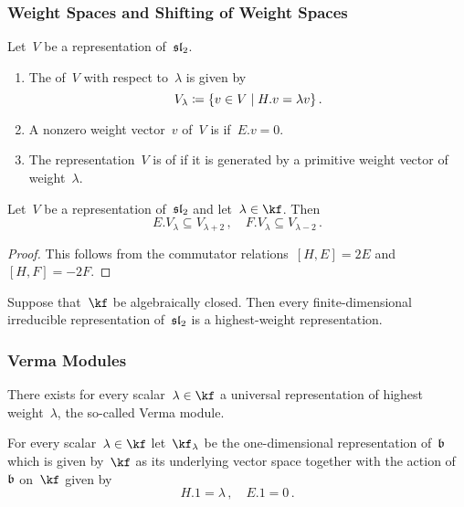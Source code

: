 \documentclass[a4paper, 11pt, oneside]{scrartcl}
\begin{document}
\subsubsection{Weight Spaces and Shifting of Weight Spaces}

\begin{definition}
  Let~$V$ be a representation of~$\mathfrak{sl}_2$.
  \begin{enumerate}
    \item
      The  of~$V$ with respect to~$\lambda$ is given by
      \[
        V_\lambda
        \defined
        \{ v \in V \suchthat H.v = \lambda v \} \,.
      \]
    \item
      A nonzero weight vector~$v$ of~$V$ is  if~$E.v = 0$.
    \item
      The representation~$V$ is of  if it is generated by a primitive weight vector of weight~$\lambda$.
  \end{enumerate}
\end{definition}

\begin{proposition}
  \label{shifting lemma}
  Let~$V$ be a representation of~$\mathfrak{sl}_2$ and let~$\lambda \in \kf$.
  Then
  \[
    E.V_\lambda
    \subseteq
    V_{\lambda + 2} \,,
    \quad
    F.V_\lambda
    \subseteq
    V_{\lambda - 2} \,.
  \]
\end{proposition}

\begin{proof}
  This follows from the commutator relations~$[H,E] = 2E$ and~$[H,F] = -2F$.
\end{proof}

\begin{lemma}
  Suppose that~$\kf$ be algebraically closed.
  Then every finite-dimensional irreducible representation of~$\mathfrak{sl}_2$ is a highest-weight representation.
\end{lemma}

\subsubsection{Verma Modules}

There exists for every scalar~$\lambda \in \kf$ a universal representation of highest weight~$\lambda$, the so-called Verma module. 

\begin{definition}
  For every scalar~$\lambda \in \kf$ let~$\kf_\lambda$ be the one-dimensional representation of~$\mathfrak{b}$ which is given by~$\kf$ as its underlying vector space together with the action of~$\mathfrak{b}$ on~$\kf$ given by
  \[
    H.1 = \lambda \,,
    \quad
    E.1 = 0 \,.
  \]
\end{definition}
\end{document}
